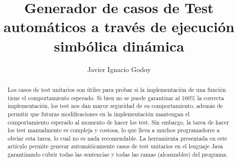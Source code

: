\documentclass{llncs}
\title{Generador de casos de Test automáticos a través de ejecución simbólica dinámica}
\author{Javier Ignacio Godoy \\ \href{mailto:\mailPersonal}{\mailPersonal} }
\institute{Instituto de Industria, Universidad Nacional de General Sarmiento, Buenos Aires, Argentina}
\begin{document}
\maketitle

\begin{abstract}
Los casos de test unitarios son útiles para probar si la implementación de una función tiene el comportamiento esperado.
Si bien no se puede garantizar al 100\% la correcta implementación, los test nos dan mayor seguridad de su comportamiento,
además de permitir que futuras modificaciones en la implementación mantengan el comportamiento esperado al momento de hacer los test.
Sin embargo, la tarea de hacer los test manualmente es compleja y costosa, lo que lleva a muchos programadores a obviar esta tarea,
lo cual no es nada recomendable. La herramienta presentada en este artículo permite generar automáticamente casos de test unitarios
en el lenguaje Java garantizando cubrir todas las sentencias y todas las ramas (alcanzables) del programa.
\end{abstract}



\end{document}
